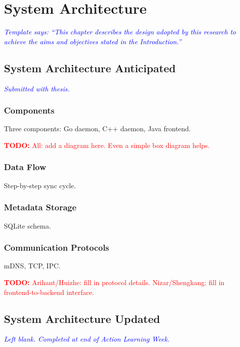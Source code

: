 \documentclass[12pt,oneside]{report}
\newcommand{\note}[1]{\textcolor{blue}{\textit{#1}}}
\newcommand{\todo}[1]{\textcolor{red}{\textbf{TODO:} #1}}
\begin{document}
\chapter{System Architecture}

\note{Template says: ``This chapter describes the design adopted by this research to achieve the aims and objectives stated in the Introduction.''}

\section{System Architecture Anticipated}
\note{Submitted with thesis.}

\subsection{Components}
Three components: Go daemon, C++ daemon, Java frontend.

\todo{All: add a diagram here. Even a simple box diagram helps.}

\subsection{Data Flow}
Step-by-step sync cycle.

\subsection{Metadata Storage}
SQLite schema.

\subsection{Communication Protocols}
mDNS, TCP, IPC.

\todo{Arihant/Huizhe: fill in protocol details. Nizar/Shengkang: fill in frontend-to-backend interface.}

\section{System Architecture Updated}
\note{Left blank. Completed at end of Action Learning Week.}

\end{document}
